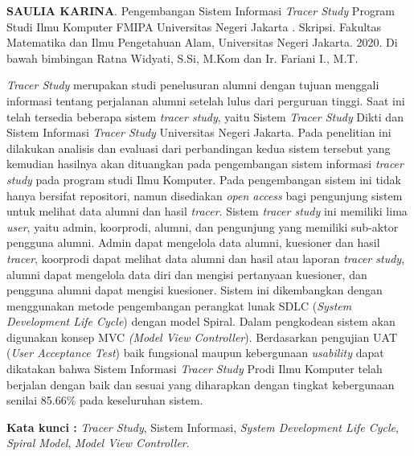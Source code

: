 \documentclass{jtetiskripsi}
\begin{document}
\begin{abstractind}
\textbf{SAULIA KARINA}. Pengembangan Sistem Informasi \textit{Tracer Study} Program Studi Ilmu Komputer FMIPA Universitas Negeri Jakarta . Skripsi. Fakultas Matematika dan Ilmu Pengetahuan Alam, Universitas Negeri Jakarta. 2020. Di bawah bimbingan Ratna Widyati, S.Si, M.Kom dan Ir. Fariani I., M.T.
\vskip1cm

\textit{Tracer Study} merupakan studi penelusuran alumni dengan tujuan menggali informasi tentang perjalanan alumni setelah lulus dari perguruan tinggi. Saat ini telah tersedia beberapa sistem \textit{tracer study}, yaitu Sistem \textit{Tracer Study} Dikti dan Sistem Informasi \textit{Tracer Study}
Universitas Negeri Jakarta. Pada penelitian ini dilakukan analisis dan evaluasi dari perbandingan kedua sistem tersebut yang kemudian hasilnya akan dituangkan pada pengembangan sistem informasi \textit{tracer study} pada program studi Ilmu Komputer. Pada pengembangan sistem ini tidak hanya bersifat repositori, namun disediakan \textit{open access} bagi pengunjung sistem untuk melihat data alumni dan hasil \textit{tracer}. Sistem \textit{tracer study} ini memiliki lima \textit{user}, yaitu admin, koorprodi, alumni, dan pengunjung yang memiliki sub-aktor pengguna alumni. Admin dapat mengelola data alumni, kuesioner dan hasil \textit{tracer}, koorprodi dapat melihat data alumni dan hasil atau laporan \textit{tracer study}, alumni dapat mengelola data diri dan mengisi pertanyaan kuesioner, dan pengguna alumni dapat mengisi kuesioner. Sistem ini dikembangkan dengan menggunakan metode pengembangan perangkat lunak SDLC (\textit{System Development Life Cycle}) dengan model Spiral. Dalam pengkodean sistem akan digunakan konsep MVC \textit{(Model View Controller}). Berdasarkan pengujian UAT (\textit{User Acceptance Test}) baik fungsional maupun kebergunaan \textit{usability} dapat dikatakan bahwa Sistem Informasi \textit{Tracer Study} Prodi Ilmu Komputer telah berjalan dengan baik dan sesuai yang diharapkan dengan tingkat kebergunaan senilai 85.66\% pada keseluruhan sistem. 


\bigskip
\noindent
\textbf{Kata kunci :} \textit{Tracer Study}, Sistem Informasi, \textit{System Development Life Cycle}, \textit{Spiral Model}, \textit{Model View Controller}.

\end{abstractind}
\end{document}
